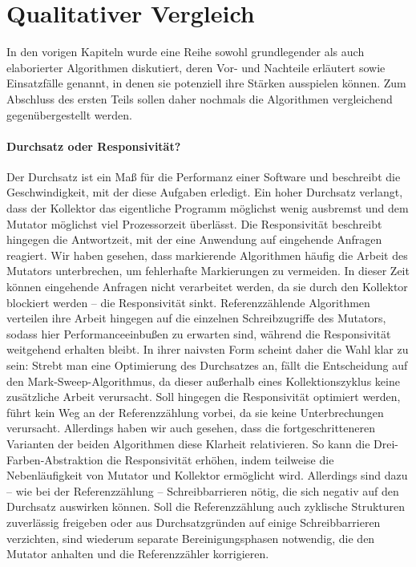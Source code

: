 \chapter{Qualitativer Vergleich}
\label{cha:comparision}

In den vorigen Kapiteln wurde eine Reihe sowohl grundlegender als auch elaborierter Algorithmen diskutiert, deren Vor- und Nachteile erläutert sowie Einsatzfälle genannt, in denen sie potenziell ihre Stärken ausspielen können.
Zum Abschluss des ersten Teils sollen daher nochmals die Algorithmen vergleichend gegenübergestellt werden.




\subsubsection*{Durchsatz oder Responsivität?}
Der Durchsatz ist ein Maß für die Performanz einer Software und beschreibt die Geschwindigkeit, mit der diese Aufgaben erledigt.
Ein hoher Durchsatz verlangt, dass der Kollektor das eigentliche Programm möglichst wenig ausbremst und dem Mutator möglichst viel Prozessorzeit überlässt.
Die Responsivität beschreibt hingegen die Antwortzeit, mit der eine Anwendung auf eingehende Anfragen reagiert.
Wir haben gesehen, dass markierende Algorithmen häufig die Arbeit des Mutators unterbrechen, um fehlerhafte Markierungen zu vermeiden.
In dieser Zeit können eingehende Anfragen nicht verarbeitet werden, da sie durch den Kollektor blockiert werden -- die Responsivität sinkt.
Referenzzählende Algorithmen verteilen ihre Arbeit hingegen auf die einzelnen Schreibzugriffe des Mutators, sodass hier Performanceeinbußen zu erwarten sind, während die Responsivität weitgehend erhalten bleibt.
In ihrer naivsten Form scheint daher die Wahl klar zu sein:
Strebt man eine Optimierung des Durchsatzes an, fällt die Entscheidung auf den Mark-Sweep-Algorithmus, da dieser außerhalb eines Kollektionszyklus keine zusätzliche Arbeit verursacht.
Soll hingegen die Responsivität optimiert werden, führt kein Weg an der Referenzzählung vorbei, da sie keine Unterbrechungen verursacht.
Allerdings haben wir auch gesehen, dass die fortgeschritteneren Varianten der beiden Algorithmen diese Klarheit relativieren.
So kann die Drei-Farben-Abstraktion die Responsivität erhöhen, indem teilweise die Nebenläufigkeit von Mutator und Kollektor ermöglicht wird.
Allerdings sind dazu -- wie bei der Referenzzählung -- Schreibbarrieren nötig, die sich negativ auf den Durchsatz auswirken können.
Soll die Referenzzählung auch zyklische Strukturen zuverlässig freigeben oder aus Durchsatzgründen auf einige Schreibbarrieren verzichten, sind wiederum separate Bereinigungsphasen notwendig, die den Mutator anhalten und die Referenzzähler korrigieren.



